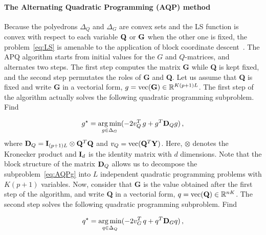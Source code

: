 \paragraph{The Alternating Quadratic Programming (AQP) method} Because the poly\-edrons $\Delta_Q$ and  $\Delta_G$ are convex sets and the LS function is convex with
respect to each variable ${\bf Q}$ or ${\bf G}$ when the other one is fixed, the problem~\eqref{eq:LS} is amenable to the application of block coordinate descent~\citep{Bertsekas1995}. The APQ algorithm starts from initial values for the $G$ and $Q$-matrices, and alternates two steps. The first step computes the matrix {\bf G} while  {\bf Q} is kept fixed, and the second step permutates the roles of {\bf G} and {\bf Q}.  Let us assume that {\bf Q} is fixed and write {\bf G} in a vectorial form, $g = {\rm vec({\bf G})} \in \mathbb{R}^{K(p + 1)L}$. The first step of the algorithm actually solves the following quadratic programming subproblem. Find  

\begin{equation}
\begin{aligned}
g^\star = \underset{g \in \Delta_G}{\arg \min}  ( -2  v^T_Q \, g + g^T {\bf D}_Q g ) \, ,  
\end{aligned}
\label{eq:AQPg}
\end{equation}
\noindent where ${\bf D}_Q = {\bf I}_{(p+1)L} \otimes {\bf Q}^T {\bf Q}$ and $v_Q = {\rm vec}({\bf Q}^T {\bf Y})$. Here, $\otimes$ denotes the Kronecker product and ${\bf I}_d$ is the identity matrix with $d$ dimensions. Note that the block structure of the matrix ${\bf D}_Q$ allows us to decompose the subproblem~\eqref{eq:AQPg} into $L$ independent quadratic programming problems with $K(p + 1)$ variables. Now, consider that {\bf G} is the value obtained after the first step of the algorithm, and write {\bf Q} in a vectorial form, $q = {\rm vec({\bf Q})} \in \mathbb{R}^{nK}$. The second step solves the following quadratic programming subproblem. Find

\begin{equation}
\begin{aligned}
q^\star = \underset{q \in \Delta_Q}{\arg \min} ( -2 v^T_G \, q + q^T {\bf D}_G q ) \,  ,
\end{aligned}
\label{eq:AQPq}
\end{equation}

